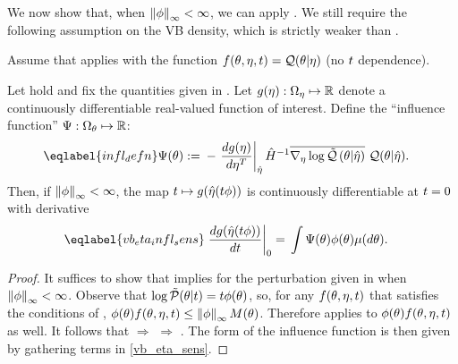 We now show that, when $\left\Vert\phi\right\Vert_{\infty} < \infty$, we can apply
.  We still require the following assumption on the VB
density, which is strictly weaker than .

\begin{assu}
%
Assume that  applies with the function $f(\theta, \eta,
t) = \mathcal{Q}(\theta \vert \eta)$ (no $t$ dependence).
%
\end{assu}


\begin{cor}
%
Let  hold and fix the quantities given in
. Let $g(\eta): \Omega_{\eta} \mapsto \mathbb{R}$ denote a
continuously differentiable real-valued function of interest.  Define the
``influence function'' $\Psi: \Omega_{\theta} \mapsto \mathbb{R}$:
%
\begin{align}\eqlabel{infl_defn}
%
\infl(\theta) :={}&
    - \fracat{d g(\eta)}{ d \eta^T}{\etaopt} \hessopt^{-1}
        \lqgradbar{\theta \vert \etaopt}
        \q(\theta \vert \etaopt).
%
\end{align}
%
Then, if $\left\Vert\phi\right\Vert_{\infty} < \infty$, the map $t \mapsto g(\hat\eta(t \phi))$ is
continuously differentiable at $t=0$ with derivative
%
\begin{align}\eqlabel{vb_eta_infl_sens}
%
\fracat{d g(\etaopt(\t \phi))}{d \t}{0} ={}&
    \int \infl(\theta) \phi(\theta) \mu(d\theta).
%
\end{align}
%
\begin{proof}
%
It suffices to show that  implies
 for the perturbation given in 
when $\left\Vert\phi\right\Vert_{\infty} < \infty$.  Observe that $\log \tilde{\mathcal{P}}(\theta \vert t) = t
\phi(\theta)$, so, for any $f(\theta, \eta, t)$ that satisfies the conditions
of ,
%
%
$\phi(\theta) f(\theta, \eta, t) \le \left\Vert\phi\right\Vert_{\infty} M(\theta)$.
%
%
Therefore  applies to $\phi(\theta) f(\theta, \eta, t)$
as well.  It follows that  $\Rightarrow$
 $\Rightarrow$ .
%
The form of the influence function is then given by gathering terms in
\eqref{vb_eta_sens}.
%
\end{proof}
%
\end{cor}

